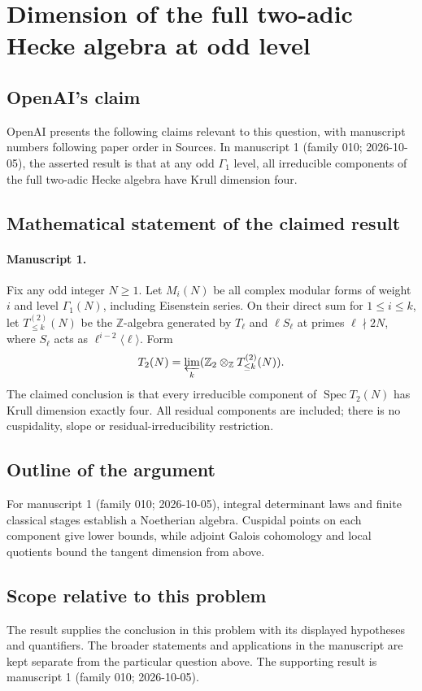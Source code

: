 \documentclass[11pt]{article}
\begin{document}
\section*{Dimension of the full two-adic Hecke algebra at odd level}

\subsection{OpenAI's claim}
OpenAI presents the following claims relevant to this question, with manuscript numbers following paper order in Sources. In manuscript 1 (family 010; 2026-10-05), the asserted result is that at any odd $\Gamma_1$ level, all irreducible components of the full two-adic Hecke algebra have Krull dimension four.

\subsection{Mathematical statement of the claimed result}
\paragraph{Manuscript 1.}
Fix any odd integer $N\ge1$. Let $M_i(N)$ be all complex modular forms of weight $i$ and level $\Gamma_1(N)$, including Eisenstein series. On their direct sum for $1\le i\le k$, let $T_{\le k}^{(2)}(N)$ be the $\mathbb Z$-algebra generated by $T_{\ell}$ and $\ell S_{\ell}$ at primes $\ell\nmid2N$, where $S_{\ell}$ acts as $\ell^{i-2}\langle\ell\rangle$. Form
\[
 T_2(N)=\varprojlim_k(\mathbb Z_2\otimes_{\mathbb Z}T_{\le k}^{(2)}(N)).
\]
The claimed conclusion is that every irreducible component of $\operatorname{Spec}T_2(N)$ has Krull dimension exactly four. All residual components are included; there is no cuspidality, slope or residual-irreducibility restriction.

\subsection{Outline of the argument}
For manuscript 1 (family 010; 2026-10-05), integral determinant laws and finite classical stages establish a Noetherian algebra. Cuspidal points on each component give lower bounds, while adjoint Galois cohomology and local quotients bound the tangent dimension from above.

\subsection{Scope relative to this problem}
The result supplies the conclusion in this problem with its displayed hypotheses and quantifiers. The broader statements and applications in the manuscript are kept separate from the particular question above. The supporting result is manuscript 1 (family 010; 2026-10-05).
\end{document}
